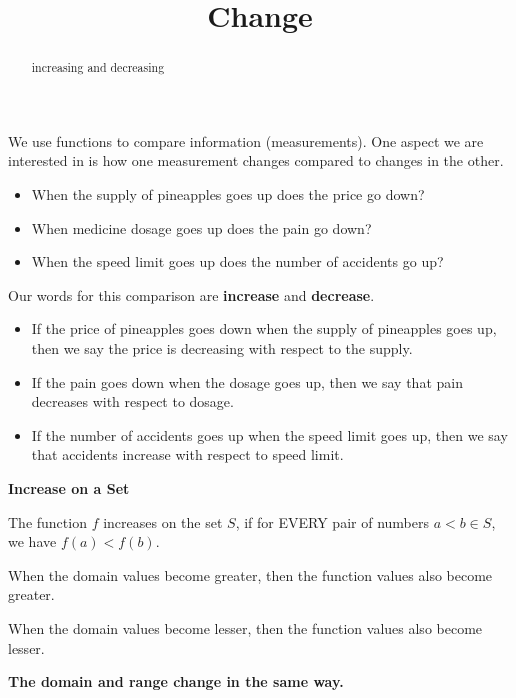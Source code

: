 \documentclass{ximera}
\title{Change}
\begin{document}
\begin{abstract}
increasing and decreasing
\end{abstract}
\maketitle



We use functions to compare information (measurements). One aspect we are interested in is how one measurement changes compared to changes in the other. 


\begin{itemize}
\item When the supply of pineapples goes up does the price go down?
\item When medicine dosage goes up does the pain go down?
\item When the speed limit goes up does the number of accidents go up?
\end{itemize}


Our words for this comparison are \textbf{\textcolor{purple!85!blue}{increase}} and \textbf{\textcolor{purple!85!blue}{decrease}}.


\begin{itemize}
\item If the price of pineapples goes down when the supply of pineapples goes up, then we say the price is decreasing with respect to the supply. 
\item If the pain goes down when the dosage goes up, then we say that pain decreases with respect to dosage. 
\item If the number of accidents goes up when the speed limit goes up, then we say that accidents increase with respect to speed limit.
\end{itemize}



\begin{definition} \textbf{\textcolor{green!50!black}{Increase on a Set}} 

The function $f$ increases on the set $S$, if for EVERY pair of numbers $a < b \in S$, we have  $f(a) < f(b)$. 

When the domain values become greater, then the function values also become greater.  

When the domain values become lesser, then the function values also become lesser.  


\textbf{\textcolor{purple!85!blue}{The domain and range change in the same way.}}



\end{definition}
\end{document}

